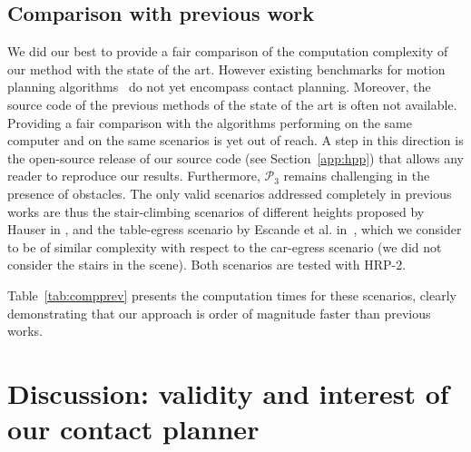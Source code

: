 \documentclass[journal]{IEEEtran}
\providecommand{\DIFaddtex}[1]{#1} %
\providecommand{\DIFdeltex}[1]{} %
\providecommand{\DIFaddbegin}{\protect\color{blue}} %
\providecommand{\DIFaddend}{\protect\color{black}} %
\providecommand{\DIFdelbegin}{\protect\cbdelete} %
\providecommand{\DIFdelend}{} %
\providecommand{\DIFadd}[1]{\texorpdfstring{\DIFaddtex{#1}}{#1}} %
\providecommand{\DIFdel}[1]{\texorpdfstring{\DIFdeltex{#1}}{}} %
\begin{document}
\DIFdelend \subsection{Comparison with previous work} \label{sec:compa}
We did our best to provide a fair comparison of the computation complexity of our method with the state of the art. 
However existing benchmarks for motion planning algorithms~\cite{moll2014extensible} do not yet encompass contact planning.
Moreover, the source code of the previous methods of the state of the art is often not available.
Providing a fair comparison with the algorithms performing on the same computer and on the same scenarios is yet out of reach.
A step in this direction is the open-source release of our source code (see \DIFdelbegin \DIFdel{Appendix}\DIFdelend \DIFaddbegin \DIFadd{Section}\DIFaddend ~\ref{app:hpp}) that allows any reader to reproduce our results.
Furthermore, $\mathcal{P}_3$ remains challenging in the presence of obstacles. The only valid scenarios addressed completely in previous works are thus the stair-climbing scenarios of different heights proposed by Hauser in \cite{Hauser06usingmotion}, and the table-egress scenario by Escande et al. in~\cite{DBLP:conf/iser/EscandeKMG08}, which we consider to be of similar complexity with respect to the car-egress scenario (we did not consider the stairs in the scene). Both scenarios are tested with HRP-2.

Table~\ref{tab:compprev} presents the computation times for these scenarios, clearly demonstrating that our approach is order of magnitude faster than previous works.




 \section{Discussion: validity and interest of our contact planner} 
\label{sec:discussion}
\end{document}
